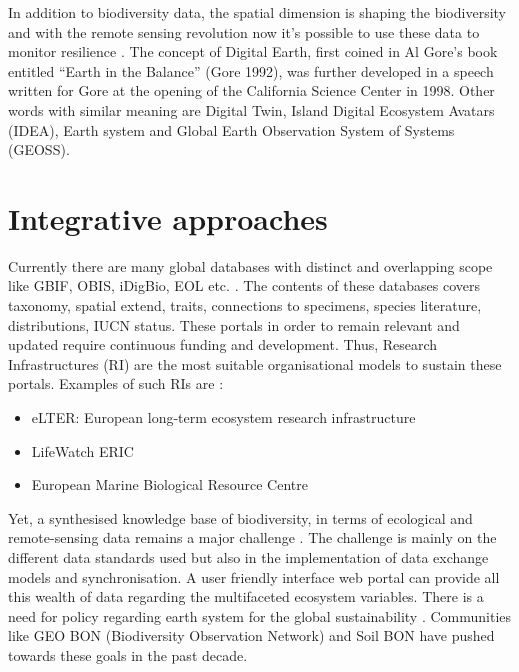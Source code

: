 In addition to biodiversity data, the spatial dimension is shaping the biodiversity and with the remote sensing revolution now
it's possible to use these data to monitor resilience \parencite{Lenton2022resilience}. 
The concept of Digital Earth, first coined in Al Gore’s book entitled 
“Earth in the Balance” (Gore 1992), was further developed in a speech
written for Gore at the opening of the California Science Center in 1998. Other words with
similar meaning are Digital Twin, Island Digital Ecosystem Avatars (IDEA), Earth system
and Global Earth Observation System of Systems (GEOSS).

\section{Integrative approaches}
\label{sec:approachintegration}


Currently there are many global databases with distinct and overlapping 
scope like GBIF, OBIS, iDigBio, EOL etc. \parencite{feng2022Review}. 
The contents of these databases covers taxonomy, spatial extend, traits, 
connections to specimens, species literature, distributions,
IUCN status. These portals in order to remain relevant and updated require 
continuous funding and development. Thus, Research Infrastructures (RI) are 
the most suitable organisational models to sustain these portals. Examples 
of such RIs are :

\begin{itemize}

    \item eLTER: European long-term ecosystem research infrastructure 
    \item LifeWatch ERIC
    \item European Marine Biological Resource Centre

\end{itemize}

Yet, a synthesised knowledge base of biodiversity, in terms of ecological and
remote-sensing data remains a major challenge \parencite{feng2022Review}. The challenge
is mainly on the different data standards used but also in the implementation of 
data exchange models and synchronisation.
A user friendly interface web portal can provide all this wealth of data
regarding the multifaceted ecosystem variables. There is a need for policy regarding earth system for the global
sustainability \parencite{reid2010earth}. Communities like GEO BON (Biodiversity Observation Network) and Soil BON
have pushed towards these goals in the past decade.

